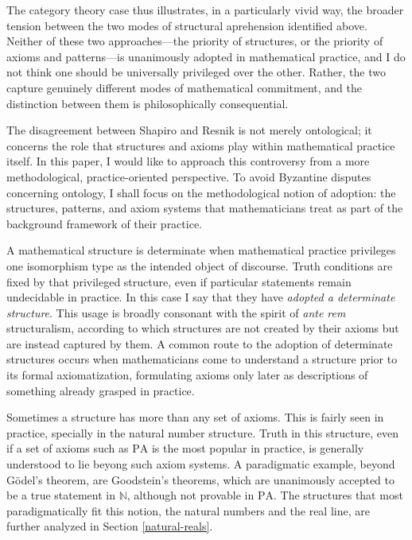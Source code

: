 \documentclass[11pt,a4paper]{article}
\begin{document}
The category theory case thus illustrates, in a particularly vivid way, the broader tension between the two modes of structural aprehension identified above. Neither of these two approaches---the priority of structures, or the priority of axioms and patterns---is unanimously adopted in mathematical practice, and I do not think one should be universally privileged over the other. Rather, the two capture genuinely different modes of mathematical commitment, and the distinction between them is philosophically consequential. 

The disagreement between Shapiro and Resnik is not merely ontological; it concerns the role that structures and axioms play within mathematical practice itself. In this paper, I would like to approach this controversy from a more methodological, practice-oriented perspective. To avoid Byzantine disputes concerning ontology, I shall focus on the methodological notion of adoption: the structures, patterns, and axiom systems that mathematicians treat as part of the background framework of their practice. 

A mathematical structure is determinate when mathematical practice privileges one isomorphism type as the intended object of discourse. Truth conditions are fixed by that privileged structure, even if particular statements remain undecidable in practice. In this case I say that they have \textit{adopted a determinate structure}. This usage is broadly consonant with the spirit of \textit{ante rem} structuralism, according to which structures are not created by their axioms but are instead captured by them. A common route to the adoption of determinate structures occurs when mathematicians come to understand a structure prior to its formal axiomatization, formulating axioms only later as descriptions of something already grasped in practice.

Sometimes a structure has more than any set of axioms. This is fairly seen in practice, specially in the natural number structure. Truth in this structure, even if a set of axioms such as $\mathrm{PA}$ is the most popular in practice,  is generally understood to lie beyong such axiom systems. A paradigmatic example, beyond Gödel's theorem, are Goodstein's theorems, which are unanimously accepted to be a true statement in $\mathbb{N}$, although not provable in $\mathrm{PA}$. The structures that most paradigmatically fit this notion, the natural numbers and the real line, are further analyzed in Section \ref{natural-reals}.
\end{document}
